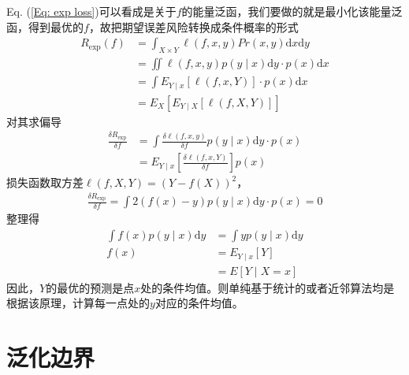 \section{}
Eq. (\ref{Eq: exp loss})可以看成是关于$f$的能量泛函，我们要做的就是最小化该能量泛函，得到最优的$f$，故把期望误差风险转换成条件概率的形式
\begin{equation}\label{Eq: exp loss conditional}
\begin{split}
  R_{\textrm{exp}}(f) &= \int_{X\times Y}\ell(f,x,y)Pr(x,y)\mathrm{d}x\mathrm{d}y \\
    & = \iint\ell(f,x,y)p(y\mid x)\mathrm{d}y \cdot p(x)\mathrm{d}x \\
    & = \int E_{Y\mid x}[\ell(f,x,Y)]\cdot p(x)\mathrm{d}x \\
    & = E_X[E_{Y\mid X}[\ell(f,X,Y)]]
\end{split}
\end{equation}
对其求偏导
\begin{equation}\label{Eq: partial derv of Exp loss}
\begin{split}
  \frac{\delta R_{\textrm{exp}}}{\delta f} &= \int \frac{\delta \ell(f,x,y)}{\delta f}p(y\mid x)\mathrm{d}y \cdot p(x) \\
    & = E_{Y\mid x}[\frac{\delta \ell(f,x,Y)}{\delta f}]p(x)
\end{split}
\end{equation}
损失函数取方差$\ell(f,X,Y) = (Y-f(X))^2$，
\begin{equation}
\begin{split}
  \frac{\delta R_{\textrm{exp}}}{\delta f} = \int 2(f(x)-y) p(y\mid x) \mathrm{d}y \cdot p(x) = 0
\end{split}
\end{equation}
整理得
\begin{equation}
\begin{split}
    \int f(x)p(y\mid x)\mathrm{d}y &= \int yp(y\mid x)\mathrm{d}y \\
    f(x) &= E_{Y\mid x}[Y] \\
        & = E[Y\mid X=x]
\end{split}
\end{equation}
因此，$Y$的最优的预测是点$x$处的条件均值。则单纯基于统计的或者近邻算法均是根据该原理，计算每一点处的$y$对应的条件均值。
\section{泛化边界}